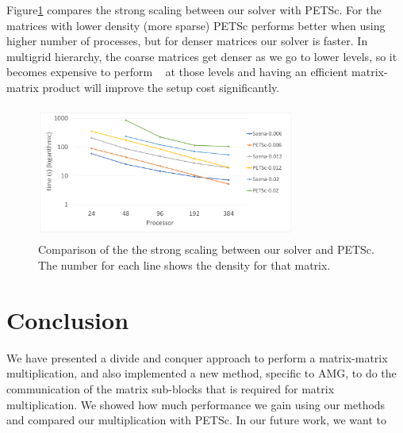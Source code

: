 Figure\ref{fig:petsc1} compares the strong scaling between our solver with PETSc. For the matrices with lower density (more sparse) PETSc performs better when using higher number of processes, but for denser matrices our solver is faster. In multigrid hierarchy, the coarse matrices get denser as we go to lower levels, so it becomes expensive to perform \mm~ at those levels and having an efficient matrix-matrix product will improve the setup cost significantly.

\begin{figure}[tbh]
 \centering
 \includegraphics[width=8.5cm,height=4.4cm]{./figures/petsc1.pdf}
 \caption{Comparison of the the strong scaling between our solver and PETSc. The number for each line shows the density for that matrix.}
 \label{fig:petsc1}
\end{figure}

\section{Conclusion}
\label{sec:conc}

We have presented a divide and conquer approach to perform a matrix-matrix multiplication, and also implemented a new method, specific to AMG, to do the communication of the matrix sub-blocks that is required for matrix multiplication. We showed how much performance we gain using our methods and compared our multiplication with PETSc. In our future work, we want to  

